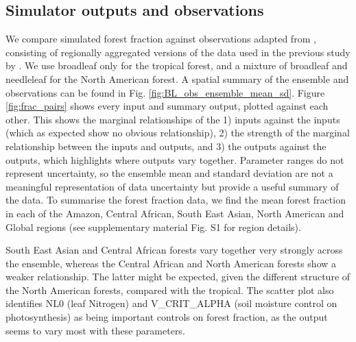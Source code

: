 \documentclass[esd, manuscript]{copernicus}
\begin{document}
\subsection{Simulator outputs and observations}\label{inputsoutputs}
We compare simulated forest fraction against observations adapted from \cite{loveland2000landcover}, consisting of regionally aggregated versions of the data used in the previous study by \cite{williams2013optimising}. We use broadleaf only for the tropical forest, and a mixture of broadleaf and needleleaf for the North American forest. A spatial summary of the ensemble and observations can be found in Fig. \ref{fig:BL_obs_ensemble_mean_sd}. Figure \ref{fig:frac_pairs} shows every input and summary output, plotted against each other. This shows the marginal relationships of the 1) inputs against the inputs (which as expected show no obvious relationship), 2) the strength of the marginal relationship between the inputs and outputs, and 3) the outputs against the outputs, which highlights where outputs vary together. Parameter ranges do not represent uncertainty, so the ensemble mean and standard deviation are not a meaningful representation of data uncertainty but provide a useful summary of the data. To summarise the forest fraction data, we find the mean forest fraction in each of the Amazon, Central African, South East Asian, North American and Global regions (see supplementary material Fig. S1 for region details).

South East Asian and Central African forests vary together very strongly across the ensemble, whereas the Central African and North American forests show a weaker relationship. The latter might be expected, given the different structure of the North American forests, compared with the tropical. The scatter plot also identifies NL0 (leaf Nitrogen) and V\_CRIT\_ALPHA (soil moisture control on photosynthesis) as being important controls on forest fraction, as the output seems to vary most with these parameters.

%


\end{document}
